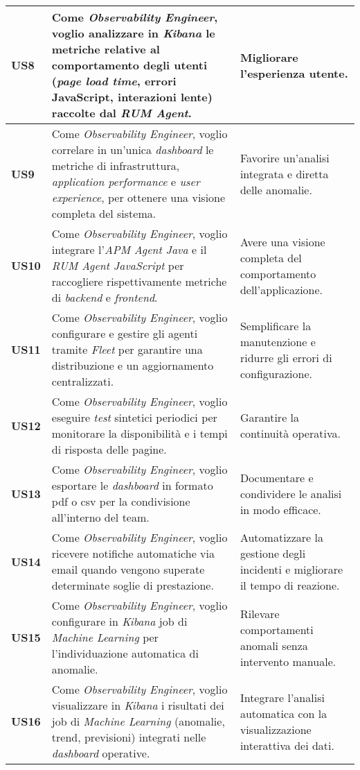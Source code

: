 \begin{longtable}{|p{1cm}|p{8cm}|p{3cm}|}
\textbf{US8} & Come \emph{Observability Engineer}, voglio analizzare in \emph{Kibana} le metriche relative al comportamento degli utenti (\emph{page load time}, errori JavaScript, interazioni lente) raccolte dal \emph{RUM Agent}. & Migliorare l'esperienza utente. \\
\hline

\textbf{US9} & Come \emph{Observability Engineer}, voglio correlare in un'unica \emph{dashboard} le metriche di infrastruttura, \emph{application performance} e \emph{user experience}, per ottenere una visione completa del sistema. & Favorire un'analisi integrata e diretta delle anomalie. \\
\hline

\textbf{US10} & Come \emph{Observability Engineer}, voglio integrare l'\emph{APM Agent Java} e il \emph{RUM Agent JavaScript} per raccogliere rispettivamente metriche di \emph{backend} e \emph{frontend}. & Avere una visione completa del comportamento dell'applicazione. \\
\hline

\textbf{US11} & Come \emph{Observability Engineer}, voglio configurare e gestire gli agenti tramite \emph{Fleet} per garantire una distribuzione e un aggiornamento centralizzati. & Semplificare la manutenzione e ridurre gli errori di configurazione. \\
\hline

\textbf{US12} & Come \emph{Observability Engineer}, voglio eseguire \emph{test} sintetici periodici per monitorare la disponibilità e i tempi di risposta delle pagine. & Garantire la continuità operativa. \\
\hline

\textbf{US13} & Come \emph{Observability Engineer}, voglio esportare le \emph{dashboard} in formato \gls{pdf} o \gls{csv} per la condivisione all'interno del team. & Documentare e condividere le analisi in modo efficace. \\
\hline

\textbf{US14} & Come \emph{Observability Engineer}, voglio ricevere notifiche automatiche via email quando vengono superate determinate soglie di prestazione. & Automatizzare la gestione degli incidenti e migliorare il tempo di reazione. \\
\hline

\textbf{US15} & Come \emph{Observability Engineer}, voglio configurare in \emph{Kibana} job di \emph{Machine Learning} per l’individuazione automatica di anomalie. & Rilevare comportamenti anomali senza intervento manuale. \\
\hline

\textbf{US16} & Come \emph{Observability Engineer}, voglio visualizzare in \emph{Kibana} i risultati dei job di \emph{Machine Learning} (anomalie, trend, previsioni) integrati nelle \emph{dashboard} operative. & Integrare l'analisi automatica con la visualizzazione interattiva dei dati. \\
\hline

\end{longtable}




